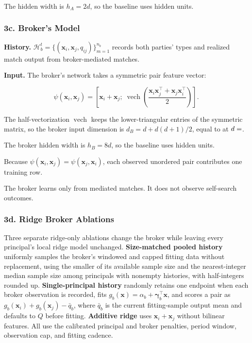 \documentclass[11pt]{article}
\begin{document}
The hidden width is \(h_A = 2d\), so the baseline uses  hidden units.

\subsubsection{3c. Broker's Model}\label{c.-brokers-model}

\textbf{History.} \(\mathcal{H}_b^t = \{(\mathbf{x}_i, \mathbf{x}_j, q_{ij})\}_{m=1}^{n_b}\) records both parties' types and realized match output from broker-mediated matches.

\textbf{Input.} The broker's network takes a symmetric pair feature vector:

\[
\psi(\mathbf{x}_i,\mathbf{x}_j)
= \left[
\mathbf{x}_i+\mathbf{x}_j;\;
\operatorname{vech}\!\left(\frac{\mathbf{x}_i\mathbf{x}_j^\top+\mathbf{x}_j\mathbf{x}_i^\top}{2}\right)
\right].
\]

The half-vectorization \(\operatorname{vech}\) keeps the lower-triangular entries of the symmetric matrix, so the broker input dimension is \(d_B = d + d(d+1)/2\), equal to  at \(d = \pv{settingd}\).

The broker hidden width is \(h_B = 8d\), so the baseline uses  hidden units.

Because \(\psi(\mathbf{x}_i,\mathbf{x}_j)=\psi(\mathbf{x}_j,\mathbf{x}_i)\), each observed unordered pair contributes one training row.

The broker learns only from mediated matches. It does not observe self-search outcomes.

\subsubsection{3d. Ridge Broker Ablations}\label{d.-ridge-broker-ablations}

Three separate ridge-only ablations change the broker while leaving every principal's local ridge model unchanged. \textbf{Size-matched pooled history} uniformly samples the broker's windowed and capped fitting data without replacement, using the smaller of its available sample size and the nearest-integer median sample size among principals with nonempty histories, with half-integers rounded up. \textbf{Single-principal history} randomly retains one endpoint when each broker observation is recorded, fits \(g_b(\mathbf x)=\alpha_b+\boldsymbol\gamma_b^\top\mathbf x\), and scores a pair as \(g_b(\mathbf x_i)+g_b(\mathbf x_j)-\bar q_b\), where \(\bar q_b\) is the current fitting-sample output mean and defaults to \(Q\) before fitting. \textbf{Additive ridge} uses \(\mathbf x_i+\mathbf x_j\) without bilinear features. All use the calibrated principal and broker penalties, period window, observation cap, and fitting cadence.
\end{document}

